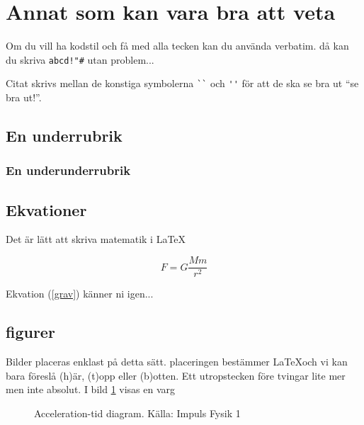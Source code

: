 \documentclass[11p]{article}
\begin{document}
    \section{Annat som kan vara bra att veta}
    Om du vill ha kodstil och få med alla tecken kan du använda verbatim. då kan du skriva \verb|abcd!"#| utan problem...

    Citat skrivs mellan de konstiga symbolerna \verb|``| och \verb|''| för att de ska se bra ut ``se bra ut!''.
    \subsection{En underrubrik}
    \subsubsection{En underunderrubrik}
    \subsection{Ekvationer}
    Det är lätt att skriva matematik i \LaTeX

    \begin{equation}
        F = G \frac{M m}{r^2}
        \label{grav}
    \end{equation}

    Ekvation (\ref{grav}) känner ni igen...

    \subsection{figurer}
    Bilder placeras enklast på detta sätt. placeringen bestämmer \LaTeX och vi kan bara föreslå (h)är, (t)opp eller (b)otten. Ett utropstecken före tvingar lite mer men inte absolut. I bild \ref{varg} visas en varg
    \begin{figure}[!h]

        \caption{Acceleration-tid diagram. Källa: Impuls Fysik 1}
        \label{varg}
    \end{figure}
    \printbibliography
\end{document}

